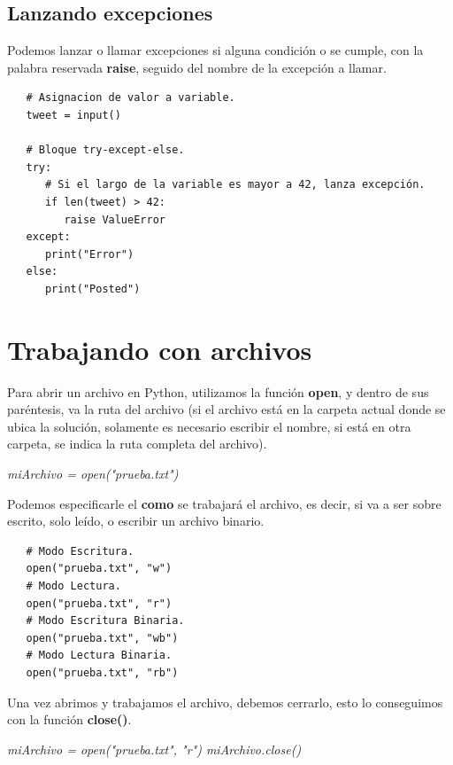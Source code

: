 \subsection{Lanzando excepciones}
\hspace{0.55cm}Podemos lanzar o llamar excepciones si alguna condición o se cumple, con la palabra reservada \textbf{raise}, seguido del nombre de la excepción a llamar.
\begin{lstlisting}
   # Asignacion de valor a variable.   
   tweet = input()

   # Bloque try-except-else.
   try:
      # Si el largo de la variable es mayor a 42, lanza excepción.
      if len(tweet) > 42:
         raise ValueError
   except:
      print("Error")
   else:
      print("Posted")
\end{lstlisting}



\section{Trabajando con archivos}
\hspace{0.55cm}Para abrir un archivo en Python, utilizamos la función \textbf{open}, y dentro de sus paréntesis, va la ruta del archivo (si el archivo está en la carpeta actual donde se ubica la solución, solamente es necesario escribir el nombre, si está en otra carpeta, se indica la ruta completa del archivo).
\begin{center}
	\textit{miArchivo = open("prueba.txt")}
\end{center}

Podemos especificarle el \textbf{como} se trabajará el archivo, es decir, si va a ser sobre escrito, solo leído, o escribir un archivo binario.
\begin{lstlisting}
   # Modo Escritura.
   open("prueba.txt", "w")
   # Modo Lectura.
   open("prueba.txt", "r")
   # Modo Escritura Binaria.
   open("prueba.txt", "wb")
   # Modo Lectura Binaria.
   open("prueba.txt", "rb")
\end{lstlisting}

Una vez abrimos y trabajamos el archivo, debemos cerrarlo, esto lo conseguimos con la función \textbf{close()}.
\begin{center}
   \textit{miArchivo = open("prueba.txt", "r")
   miArchivo.close()}
\end{center}

